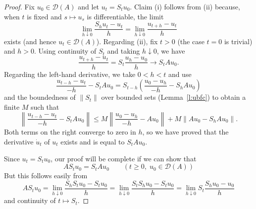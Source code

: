 \documentclass[12pt, reqno]{amsart}
\renewcommand{\leq}{\leqslant}
\renewcommand{\geq}{\geqslant}
\newcommand{\1}{\mathbbm 1}
\newcommand{\dD}{\mathcal D}
\theoremstyle{plain}
\theoremstyle{definition}
\begin{document}
\begin{proof}
    Fix $u_0 \in \dD(A)$ and let $u_t = S_t u_0$. Claim (i) follows from (ii)
    because, when $t$ is fixed and $s \mapsto u_s$ is differentiable, the limit
    \begin{equation*}
        \lim_{h \downarrow 0}
         \frac{S_h u_t - u_t}{h}
         =
        \lim_{h \downarrow 0}
         \frac{u_{t+h} - u_t}{h} 
    \end{equation*}
    exists (and hence $u_t \in \dD(A)$).
    Regarding (ii), fix $t > 0$  (the case $t=0$ is trivial) and $h > 0$.  Using
    continuity of $S_t$ and taking $h \downarrow 0$, we have
    \begin{equation*}
         \frac{u_{t+h} - u_t}{h} = S_t \frac{u_h - u_0}{h} \to S_t A u_0.
    \end{equation*}
    Regarding the left-hand derivative, we take $0 < h < t$ and use
    \begin{equation*}
        \frac{u_{t-h} - u_t}{-h} - S_t A u_0
        = S_{t-h} \left( \frac{u_0 - u_h}{-h} - S_h A u_0 \right)
    \end{equation*}
    and the boundedness of $\| S_t \|$ over bounded sets (Lemma~\ref{l:ubfc}) to
    obtain a finite $M$ such that
    \begin{equation*}
        \left\|
            \frac{u_{t-h} - u_t}{-h} - S_t A u_0
        \right\|
        \leq M
        \left\|
            \frac{u_0 - u_h}{-h} - A u_0
        \right\|
        +
        M
        \left\|
            A u_0 - S_h A u_0
        \right\|.
    \end{equation*}
    Both terms on the right converge to zero in $h$, so we have proved that
    the derivative $\dot u_t$ of $u_t$ exists and is equal to $S_t A u_0$.

    Since $u_t = S_t u_0$, our proof will be complete if we can show that 
    \begin{equation}\label{eq:stuat}
        A S_t u_0 = S_t A u_0 
        \qquad (t \geq 0, \; u_0 \in \dD(A))
    \end{equation}
    But this follows easily from 
    \begin{equation*}
        A S_t u_0
        = \lim_{h \downarrow 0} \frac{S_h S_t u_0 - S_t u_0}{h}
        = \lim_{h \downarrow 0} \frac{S_t S_h u_0 - S_t u_0}{h}
        = \lim_{h \downarrow 0} S_t \frac{S_h u_0 - u_0}{h}
    \end{equation*}
    and continuity of $t \mapsto S_t$.
\end{proof}




\end{document}
